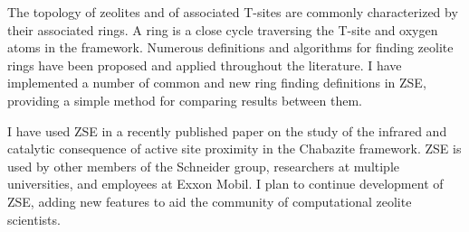 \documentclass[11pt]{article}
\begin{document}
The topology of zeolites and of associated T-sites are commonly characterized by their associated rings. A ring is a close cycle traversing the T-site and oxygen atoms in the framework. Numerous definitions and algorithms for finding zeolite rings have been proposed and applied throughout the literature. I have implemented a number of common and new ring finding definitions in ZSE, providing a simple method for comparing results between them. 

I have used ZSE in a recently published paper on the study of the infrared and catalytic consequence of active site proximity in the Chabazite framework. \cite{kester-2021-effec-broen} ZSE is used by other members of the Schneider group, researchers at multiple universities, and employees at Exxon Mobil. I plan to continue development of ZSE, adding new features to aid the community of computational zeolite scientists. 



\end{document}
